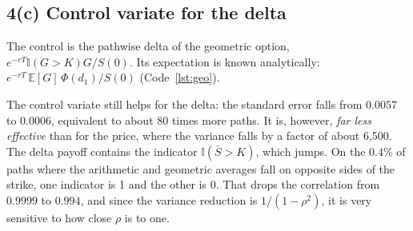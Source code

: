 \documentclass[11pt,a4paper]{article}
\newcommand{\restab}[3]{%
  \begin{table}[H]\centering\footnotesize
  \caption{#2}\label{#3}
  
  \end{table}}
\begin{document}
\subsection*{4(c) Control variate for the delta}
The control is the pathwise delta of the geometric option,
$e^{-rT}\mathbb I(G>K)G/S(0)$. Its expectation is known analytically:
$e^{-rT}\,\mathbb E[G]\,\Phi(d_1)/S(0)$ (Code~\ref{lst:geo}).
\restab{q4_cv}{Plain versus control variate estimates, $P=10{,}000$.
``Var.\ reduction'' is $1/(1-\rho^2)$.}{tab:q4-cv}
The control variate still helps for the delta: the standard error falls from
$0.0057$ to $0.0006$, equivalent to about 80 times more paths. It is,
however, \emph{far less effective} than for the price, where the variance
falls by a factor of about 6,500. The delta payoff contains the indicator
$\mathbb I(\bar S>K)$, which jumps. On the $0.4\%$ of paths where the
arithmetic and geometric averages fall on opposite sides of the strike, one
indicator is 1 and the other is 0. That drops the correlation from $0.9999$
to $0.994$, and since the variance reduction is $1/(1-\rho^2)$, it is very
sensitive to how close $\rho$ is to one.
\end{document}
